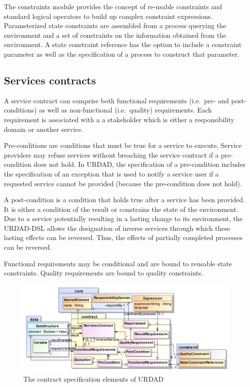 The constraints module provides the concept of re-usable constraints and standard logical operators to build up complex constraint expressions. Parameterized state constraints are assembled from a process querying the environment and a set of constraints on the information obtained from the environment. A state constraint reference has the option to include a constraint parameter as well as the specification of a process to construct that parameter.


\subsection{Services contracts}

A service contract can comprise both functional requirements (i.e.\ pre- and post-conditions) as well as non-functional (i.e.\ quality) requirements. Each requirement is associated with a a stakeholder which is either a responsibility domain or another service. 

Pre-conditions are conditions that must be true for a service to execute. Service providers may refuse  services without breaching the service contract if a pre-condition does not hold. In URDAD, the specification of a pre-condition includes the specification of an exception that is used to notify a service user if a requested service cannot be provided (because the pre-condition does not hold). 

A post-condition is a condition that holds true after a service has been provided. It is either a condition of the result or constrains the state of the environment. Due to a service potentially resulting in a lasting change to its environment, the URDAD-DSL allows the designation of inverse services through which these lasting effects can be reversed. Thus, the effects of partially completed processes can be reversed.

Functional requirements may be conditional and are bound to reusable state constraints.  Quality requirements are bound to quality constraints.

\begin{figure}[Htbp]
  \centering
  \includegraphics{contract}
  \caption{The contract specification elements of URDAD}
  \label{fig:metamodel}
\end{figure}

